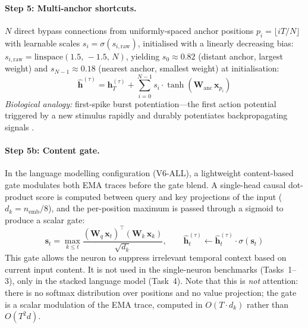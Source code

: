 \documentclass[11pt,a4paper]{article}
\begin{document}
\paragraph{Step 5: Multi-anchor shortcuts.}
$N$ direct bypass connections from uniformly-spaced anchor positions
$p_i = \lfloor iT/N \rfloor$ with learnable scales
$s_i = \sigma(s_{i,\mathrm{raw}})$, initialised with a linearly
decreasing bias:
$s_{i,\mathrm{raw}} = \mathrm{linspace}(1.5,\,-1.5,\,N)$,
yielding $s_0 \approx 0.82$ (distant anchor, largest weight) and
$s_{N-1} \approx 0.18$ (nearest anchor, smallest weight) at initialisation:
\begin{equation}
  \hat{\mathbf{h}}^{(\tau)} = \mathbf{h}_T^{(\tau)}
    + \sum_{i=0}^{N-1} s_i \cdot \tanh(\mathbf{W}_\mathrm{anc}\,\mathbf{x}_{p_i})
  \label{eq:anchor}
\end{equation}
\emph{Biological analogy:} first-spike burst potentiation---the first
action potential triggered by a new stimulus rapidly and durably
potentiates backpropagating signals \citep{larkum1999new, thorpe2001spike}.

\paragraph{Step 5b: Content gate.}
In the language modelling configuration (V6-ALL), a lightweight
content-based gate modulates both EMA traces before the gate blend.
A single-head causal dot-product score is computed between query and key
projections of the input ($d_k = n_\mathrm{emb}/8$), and the per-position
maximum is passed through a sigmoid to produce a scalar gate:
\begin{equation}
  \mathbf{s}_t = \max_{k \leq t}
    \frac{(\mathbf{W}_q\,\mathbf{x}_t)^\top(\mathbf{W}_k\,\mathbf{x}_k)}
         {\sqrt{d_k}},
  \qquad
  \hat{\mathbf{h}}^{(\tau)}_t \leftarrow \hat{\mathbf{h}}^{(\tau)}_t
    \cdot \sigma(\mathbf{s}_t)
  \label{eq:content_gate}
\end{equation}
This gate allows the neuron to suppress irrelevant temporal context
based on current input content.
It is not used in the single-neuron benchmarks (Tasks~1--3),
only in the stacked language model (Task~4).
Note that this is \emph{not} attention: there is no softmax distribution
over positions and no value projection; the gate is a scalar modulation
of the EMA trace, computed in $O(T \cdot d_k)$ rather than $O(T^2 d)$.
\end{document}
